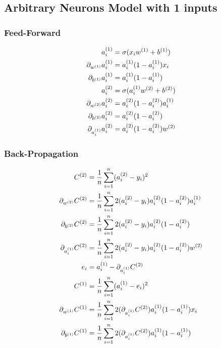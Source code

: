 \documentclass{article}
\begin{document}
\subsection{Arbitrary Neurons Model with 1 inputs}

\subsubsection{Feed-Forward}

\begin{align}
    a_i\s[1] &= \sigma(x_iw\s[1] + b\s[1]) \\
    \pd[{w\s[1]}]a_i\s[1] &= a_i\s[1](1 - a_i\s[1])x_i \\
    \pd[{b\s[1]}]a_i\s[1] &= a_i\s[1](1 - a_i\s[1]) \\
    a_i\s[2] &= \sigma(a_i\s[1]w\s[2] + b\s[2]) \\
    \pd[{w\s[2]}]a_i\s[2] &= a_i\s[2](1 - a_i\s[2])a_i\s[1] \\
    \pd[{b\s[2]}]a_i\s[2] &= a_i\s[2](1 - a_i\s[2]) \\
    \pd[{a_i\s[1]}]a_i\s[2] &= a_i\s[2](1 - a_i\s[2])w\s[2] \\
\end{align}
\subsubsection{Back-Propagation}
\begin{align}
    C\s[2] &= \avgsum[i, n] (a_i\s[2] - y_i)^2 \\
    \pd[{w\s[2]}] C\s[2]
        &= \avgsum[i, n] 2(a_i\s[2] - y_i)a_i\s[2](1 - a_i\s[2])a_i\s[1] \\
    \pd[{b\s[2]}] C\s[2]
        &= \avgsum[i, n] 2(a_i\s[2] - y_i)a_i\s[2](1 - a_i\s[2]) \\
    \pd[{a_i\s[1]}] C\s[2]
        &= \avgsum[i, n] 2(a_i\s[2] - y_i)a_i\s[2](1 - a_i\s[2])w\s[2] \\
    e_i
        &= a_i\s[1] - \pd[{a_i\s[1]}]C\s[2] \\
    C\s[1]
        &= \avgsum[i, n] (a_i\s[1] - e_i)^2 \\
    \pd[{w\s[1]}]C\s[1]
        &= \avgsum[i, n] 2(\pd[{a_i\s[1]}]C\s[2]) a_i\s[1](1 - a_i\s[1])x_i \\
    \pd[{b\s[1]}]C\s[1]
        &= \avgsum[i, n] 2(\pd[{a_i\s[1]}]C\s[2]) a_i\s[1](1 - a_i\s[1])
\end{align}
\end{document}
